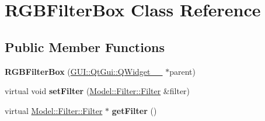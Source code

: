\hypertarget{classGUI_1_1RGBFilterBox}{}\section{R\+G\+B\+Filter\+Box Class Reference}
\label{classGUI_1_1RGBFilterBox}
\subsection*{Public Member Functions}
\begin{DoxyCompactItemize}
\item 
\hypertarget{classGUI_1_1RGBFilterBox_af79693af5e51c861f2a4b1a740e5c829}{}{\bfseries R\+G\+B\+Filter\+Box} (\hyperlink{classGUI_1_1QtGui_1_1QWidget____10}{G\+U\+I\+::\+Qt\+Gui\+::\+Q\+Widget\+\_\+\+\_} $\ast$parent)\label{classGUI_1_1RGBFilterBox_af79693af5e51c861f2a4b1a740e5c829}

\item 
\hypertarget{classGUI_1_1RGBFilterBox_ad7c0ee00fe3faac7942d75eec2a5342b}{}virtual void {\bfseries set\+Filter} (\hyperlink{classModel_1_1Filter_1_1Filter}{Model\+::\+Filter\+::\+Filter} \&filter)\label{classGUI_1_1RGBFilterBox_ad7c0ee00fe3faac7942d75eec2a5342b}

\item 
\hypertarget{classGUI_1_1RGBFilterBox_acef2029a93f4ab3a538cdb643b9c2613}{}virtual \hyperlink{classModel_1_1Filter_1_1Filter}{Model\+::\+Filter\+::\+Filter} $\ast$ {\bfseries get\+Filter} ()\label{classGUI_1_1RGBFilterBox_acef2029a93f4ab3a538cdb643b9c2613}

\end{DoxyCompactItemize}
